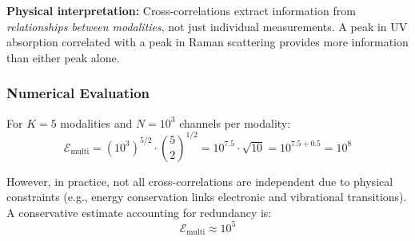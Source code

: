 \documentclass[twocolumn,10pt]{article}
\theoremstyle{remark}
\begin{document}
\textbf{Physical interpretation:} Cross-correlations extract information from \textit{relationships between modalities}, not just individual measurements. A peak in UV absorption correlated with a peak in Raman scattering provides more information than either peak alone.

\subsubsection{Numerical Evaluation}

For $K = 5$ modalities and $N = 10^3$ channels per modality:
\begin{equation}
    \mathcal{E}_{\text{multi}} = (10^3)^{5/2} \cdot \binom{5}{2}^{1/2} = 10^{7.5} \cdot \sqrt{10} = 10^{7.5 + 0.5} = 10^{8}
    \label{eq:multimodal_numerical_full}
\end{equation}

However, in practice, not all cross-correlations are independent due to physical constraints (e.g., energy conservation links electronic and vibrational transitions). A conservative estimate accounting for redundancy is:
\begin{equation}
    \mathcal{E}_{\text{multi}} \approx 10^{5}
    \label{eq:multimodal_conservative}
\end{equation}
\end{document}
